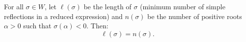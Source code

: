 For all $\sigma \in W$, let $\ell(\sigma)$ be the length of $\sigma$ (minimum number of simple reflections in a reduced expression) and $n(\sigma)$ be the number of positive roots $\alpha > 0$ such that $\sigma(\alpha) < 0$. Then:
$$\ell(\sigma) = n(\sigma).$$